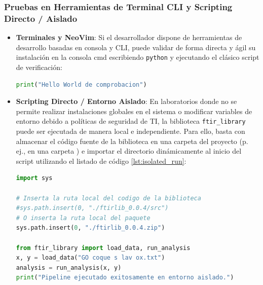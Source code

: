 \subsubsection{Pruebas en Herramientas de Terminal CLI y Scripting Directo / Aislado}
\begin{itemize}
    \item \textbf{Terminales y NeoVim}: Si el desarrollador dispone de herramientas de desarrollo basadas en consola y CLI, puede validar de forma directa y ágil su instalación en la consola cmd escribiendo \texttt{python} y ejecutando el clásico script de verificación:
    \begin{lstlisting}[language=Python]
print("Hello World de comprobacion")
    \end{lstlisting}
    \item \textbf{Scripting Directo / Entorno Aislado}: En laboratorios donde no se permite realizar instalaciones globales en el sistema o modificar variables de entorno debido a políticas de seguridad de TI, la biblioteca \texttt{ftir\_library} puede ser ejecutada de manera local e independiente. Para ello, basta con almacenar el código fuente de la biblioteca en una carpeta del proyecto (p. ej., en una carpeta ) e importar el directorio dinámicamente al inicio del script utilizando el listado de código \ref{lst:isolated_run}:
    
    \begin{lstlisting}[language=Python, label=lst:isolated_run, caption=Importacion dinamica y aislada de ftirlib sin instalacion global]
import sys

# Inserta la ruta local del codigo de la biblioteca
#sys.path.insert(0, "./ftirlib_0.0.4/src")
# O inserta la ruta local del paquete
sys.path.insert(0, "./ftirlib_0.0.4.zip")

from ftir_library import load_data, run_analysis
x, y = load_data("GO coque s lav ox.txt")
analysis = run_analysis(x, y)
print("Pipeline ejecutado exitosamente en entorno aislado.")
    \end{lstlisting}
\end{itemize}
\newpage
